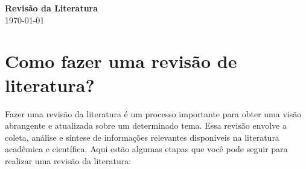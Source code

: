 \documentclass[12pt,a4paper, brazil]{article}
\begin{document}
\begin{center}
{\textbf {\huge Revisão da Literatura}}\\[5mm]
\today\\[5mm] %
\end{center}



\section{Como fazer uma revisão de literatura?}

Fazer uma revisão da literatura é um processo importante para obter uma visão abrangente e atualizada sobre um determinado tema. Essa revisão envolve a coleta, análise e síntese de informações relevantes disponíveis na literatura acadêmica e científica. Aqui estão algumas etapas que você pode seguir para realizar uma revisão da literatura:
\end{document}
